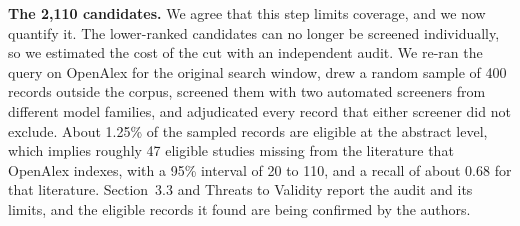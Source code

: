     \item \textbf{The 2{,}110 candidates.} We agree that this step limits coverage, and we now quantify it. The lower-ranked candidates can no longer be screened individually, so we estimated the cost of the cut with an independent audit. We re-ran the query on OpenAlex for the original search window, drew a random sample of 400 records outside the corpus, screened them with two automated screeners from different model families, and adjudicated every record that either screener did not exclude. About 1.25\% of the sampled records are eligible at the abstract level, which implies roughly 47 eligible studies missing from the literature that OpenAlex indexes, with a 95\% interval of 20 to 110, and a recall of about 0.68 for that literature. Section~3.3 and Threats to Validity report the audit and its limits, and the eligible records it found are being confirmed by the authors.
